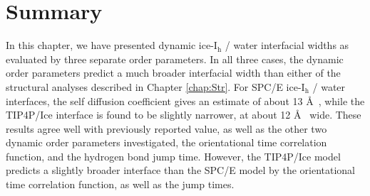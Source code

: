 \section{Summary}
In this chapter, we have presented dynamic ice-I$_\mathrm{h}$ / water
interfacial widths as evaluated by three separate order parameters. In
all three cases, the dynamic order parameters predict a much broader
interfacial width than either of the structural analyses described in
Chapter \ref{chap:Str}.  For SPC/E ice-I$_\mathrm{h}$ / water
interfaces, the self diffusion coefficient gives an estimate of about
13 \AA~, while the TIP4P/Ice interface is found to be slightly
narrower, at about 12 \AA~ wide. These results agree well with
previously reported value, as well as the other two dynamic order
parameters investigated, the orientational time correlation function,
and the hydrogen bond jump time. However, the TIP4P/Ice model predicts
a slightly broader interface than the SPC/E model by the orientational
time correlation function, as well as the jump times.
